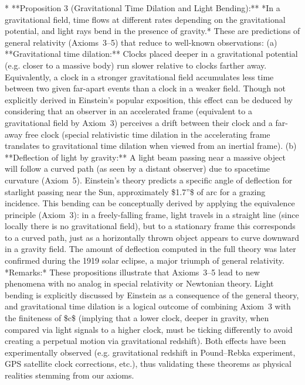 \documentclass{article}
\begin{document}
* **Proposition 3 (Gravitational Time Dilation and Light Bending):** *In a gravitational field, time flows at different rates depending on the gravitational potential, and light rays bend in the presence of gravity.* These are predictions of general relativity (Axioms 3–5) that reduce to well-known observations: (a) **Gravitational time dilation:** Clocks placed deeper in a gravitational potential (e.g. closer to a massive body) run slower relative to clocks farther away. Equivalently, a clock in a stronger gravitational field accumulates less time between two given far-apart events than a clock in a weaker field. Though not explicitly derived in Einstein’s popular exposition, this effect can be deduced by considering that an observer in an accelerated frame (equivalent to a gravitational field by Axiom 3) perceives a drift between their clock and a far-away free clock (special relativistic time dilation in the accelerating frame translates to gravitational time dilation when viewed from an inertial frame). (b) **Deflection of light by gravity:** A light beam passing near a massive object will follow a curved path (as seen by a distant observer) due to spacetime curvature (Axiom 5). Einstein’s theory predicts a specific angle of deflection for starlight passing near the Sun, approximately \$1.7''\$ of arc for a grazing incidence. This bending can be conceptually derived by applying the equivalence principle (Axiom 3): in a freely-falling frame, light travels in a straight line (since locally there is no gravitational field), but to a stationary frame this corresponds to a curved path, just as a horizontally thrown object appears to curve downward in a gravity field. The amount of deflection computed in the full theory was later confirmed during the 1919 solar eclipse, a major triumph of general relativity.  *Remarks:* These propositions illustrate that Axioms 3–5 lead to new phenomena with no analog in special relativity or Newtonian theory. Light bending is explicitly discussed by Einstein as a consequence of the general theory, and gravitational time dilation is a logical outcome of combining Axiom 3 with the finiteness of \$c\$ (implying that a lower clock, deeper in gravity, when compared via light signals to a higher clock, must be ticking differently to avoid creating a perpetual motion via gravitational redshift). Both effects have been experimentally observed (e.g. gravitational redshift in Pound–Rebka experiment, GPS satellite clock corrections, etc.), thus validating these theorems as physical realities stemming from our axioms.
\end{document}
